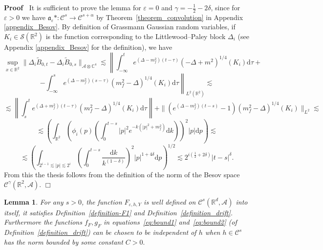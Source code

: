 \documentclass{article}
\newcommand{\asterisk}{\mathord{*}}
\newcommand{\mathd}{\mathrm{d}}
\newenvironment{proof}{\noindent\textbf{Proof\ }}{\hspace*{\fill}$\Box$\medskip}
\newtheorem{lemma}[theorem]{Lemma}
\begin{document}
\begin{proof}
  It is sufficient to prove the lemma for $\varepsilon = 0$ and $\gamma = -
  \frac{1}{2} - 2 \delta$, since for $\varepsilon > 0$ we have
  $\mathfrak{a}_{\varepsilon} \asterisk : \mathcal{C}^s \rightarrow
  \mathcal{C}^{s + \alpha}$ by Theorem~\ref{theorem_convolution} in Appendix
  \ref{appendix_Besov}. By definition of Grassmann Gaussian random variables,
  if $K_i \in \mathcal{S} (\mathbb{R}^2)$ is the function corresponding to the
  Littlewood--Paley block $\Delta_i$ (see Appendix \ref{appendix_Besov} for
  the definition), we have
  \[ \sup_{x \in \mathbb{R}^2} \| \Delta_i \tilde{B}_{0, t} - \Delta_i
     \tilde{B}_{0, s} \|_{\mathcal{A} \otimes \mathbb{C}^4} \lesssim \left.
     \left\| \int_{- \infty}^t e^{(\Delta - m_f^2) (t - \tau)} (- \Delta +
     m^2)^{1 / 4} (K_i) \mathd \tau + \right. \right. \]
  \[ \left. \left. - \int_{- \infty}^s e^{(\Delta - m_f^2) (s - \tau)} (m^2_f
     - \Delta)^{1 / 4} (K_i) \mathd \tau \right\| \right._{L^2 (\mathbb{R}^2)}
     \lesssim \]
  \[ \lesssim \left\| \int_s^t e^{(\Delta + m_f^2) (t - \tau)} (m^2_f -
     \Delta)^{1 / 4} (K_i) \mathd \tau \right\| + \| (e^{(\Delta - m_f^2) (t -
     s)} - 1) (m^2_f - \Delta)^{1 / 4} (K_i) \|_{L^2} \lesssim \]
  \[ \lesssim \left( \int_{\mathbb{R}^2} \left( \phi_i (p) \left( \int_0^{t -
     s} | p |^2 e^{- k (| p |^2 + m^2_f)} \mathd k \right) \right)^2 | p |
     \mathd p \right) \lesssim \]
  \[ \lesssim \left( \int_{2^{i - 1} \lesssim | p | \lesssim 2^i} \left(
     \int_0^{t - s} \frac{\mathd k}{k^{(1 - \delta)}} \right)^2 | p |^{1 + 4
     \delta} \mathd p \right)^{1 / 2} \lesssim 2^{i \left( \frac{1}{2} + 2
     \delta \right)} | t - s |^{\delta} . \]
  From this the thesis follows from the definition of the norm of the Besov
  space $\mathcal{C}^{\gamma} (\mathbb{R}^2, \mathcal{A})$.
\end{proof}

\begin{lemma}
  \label{lemma_drift}For any $s > 0$, the function $F_{\varepsilon, h, Y}$ is
  well defined on $\mathcal{C}^s (\mathbb{R}^d, \mathcal{A})$ into itself, it
  satisfies Definition~\ref{definition-F1} and
  Definition~\ref{definition_drift}. Furthermore the functions $f_F, g_F$ in
  equations~{\eqref{eq:bound1}} and~{\eqref{eq:bound2}} (of
  Definition~\ref{definition_drift}) can be chosen to be independent of $h$
  when $h \in \mathcal{C}^s$ has the norm bounded by some constant $C > 0.$
\end{lemma}
\end{document}
